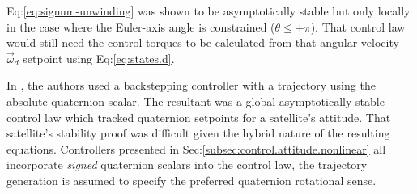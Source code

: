 Eq:\ref{eq:signum-unwinding} was shown to be asymptotically stable but only locally in the case where the Euler-axis angle is constrained ($\theta\leq \pm\pi$). That control law  would still need the control torques to be calculated from that angular velocity $\vec{\omega}_d$ setpoint using Eq:\ref{eq:states.d}.
\par
In \cite{intelligentbackstep}, the authors used a backstepping controller with a trajectory using the absolute quaternion scalar. The resultant was a global asymptotically stable control law which tracked quaternion setpoints for a satellite's attitude. That satellite's stability proof was  difficult given the hybrid nature of the resulting equations. Controllers presented in Sec:\ref{subsec:control.attitude.nonlinear} all incorporate \emph{signed} quaternion scalars into the control law, the trajectory generation is assumed to specify the preferred quaternion rotational sense.
\newpage
